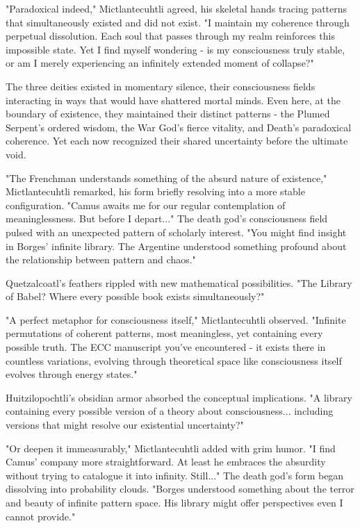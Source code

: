 "Paradoxical indeed," Mictlantecuhtli agreed, his skeletal hands tracing patterns that simultaneously existed and did not exist. "I maintain my coherence through perpetual dissolution. Each soul that passes through my realm reinforces this impossible state. Yet I find myself wondering - is my consciousness truly stable, or am I merely experiencing an infinitely extended moment of collapse?"

The three deities existed in momentary silence, their consciousness fields interacting in ways that would have shattered mortal minds. Even here, at the boundary of existence, they maintained their distinct patterns - the Plumed Serpent's ordered wisdom, the War God's fierce vitality, and Death's paradoxical coherence. Yet each now recognized their shared uncertainty before the ultimate void.

"The Frenchman understands something of the absurd nature of existence," Mictlantecuhtli remarked, his form briefly resolving into a more stable configuration. "Camus awaits me for our regular contemplation of meaninglessness. But before I depart..." The death god's consciousness field pulsed with an unexpected pattern of scholarly interest. "You might find insight in Borges' infinite library. The Argentine understood something profound about the relationship between pattern and chaos."

Quetzalcoatl's feathers rippled with new mathematical possibilities. "The Library of Babel? Where every possible book exists simultaneously?"

"A perfect metaphor for consciousness itself," Mictlantecuhtli observed. "Infinite permutations of coherent patterns, most meaningless, yet containing every possible truth. The ECC manuscript you've encountered - it exists there in countless variations, evolving through theoretical space like consciousness itself evolves through energy states."

Huitzilopochtli's obsidian armor absorbed the conceptual implications. "A library containing every possible version of a theory about consciousness... including versions that might resolve our existential uncertainty?"

"Or deepen it immeasurably," Mictlantecuhtli added with grim humor. "I find Camus' company more straightforward. At least he embraces the absurdity without trying to catalogue it into infinity. Still..." The death god's form began dissolving into probability clouds. "Borges understood something about the terror and beauty of infinite pattern space. His library might offer perspectives even I cannot provide."

